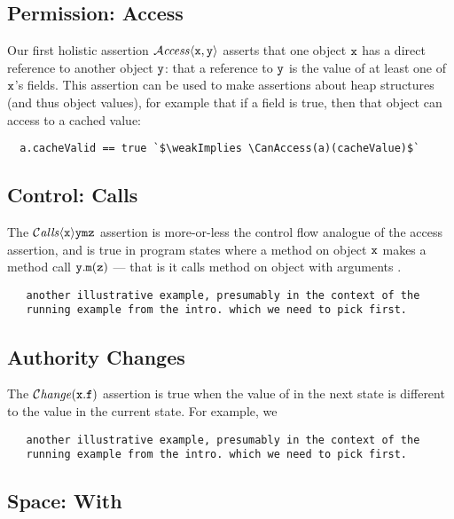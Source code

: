 \subsection{Permission: Access}

Our first holistic assertion ${\mathcal{A}}\textrm{\textit{ccess}}\langle {\mbox{\tt{x}}},{\mbox{\tt{y}}}\rangle$ asserts that one
object ${\mbox{\tt{x}}}$ has a direct reference to another object ${\mbox{\tt{y}}}$: that a
reference to ${\mbox{\tt{y}}}$ is the value of at least one of ${\mbox{\tt{x}}}$'s fields.
This assertion can be used to make assertions about heap structures (and thus
object values), for example that if a  field is true,
then that object can access to a cached value:

\begin{lstlisting}
  a.cacheValid == true `$\weakImplies \CanAccess(a)(cacheValue)$` 
\end{lstlisting}



\subsection{Control: Calls}

The  ${\mathcal{C}}\textrm{\textit{alls}}\langle {\mbox{\tt{x}}}\rangle {{\mbox{\tt{y}}}} {{\mbox{\tt{m}}}} {{{\mbox{\tt{z}}}}}$
assertion is more-or-less the control flow analogue of
the access assertion, and is true 
in program states where a method on object 
${{\mbox{\tt{x}}}}$ makes a method call ${{\mbox{\tt{y}}}}.{{\mbox{\tt{m}}}}({{{\mbox{\tt{z}}}}})$ --- that is it calls method 
{\m} on object {\y} with arguments {\z}.


\begin{lstlisting}
   another illustrative example, presumably in the context of the
   running example from the intro. which we need to pick first.
\end{lstlisting}


\subsection{Authority Changes}

The $\mathcal{C}\textrm{\textit{hange}}({\mbox{\tt{x}}}.{\mbox{\tt{f}}})$  assertion is true when the value of 
in the next state is different to the value in the current state.
For example, we 

\begin{lstlisting}
   another illustrative example, presumably in the context of the
   running example from the intro. which we need to pick first.
\end{lstlisting}

\subsection{Space: With}

